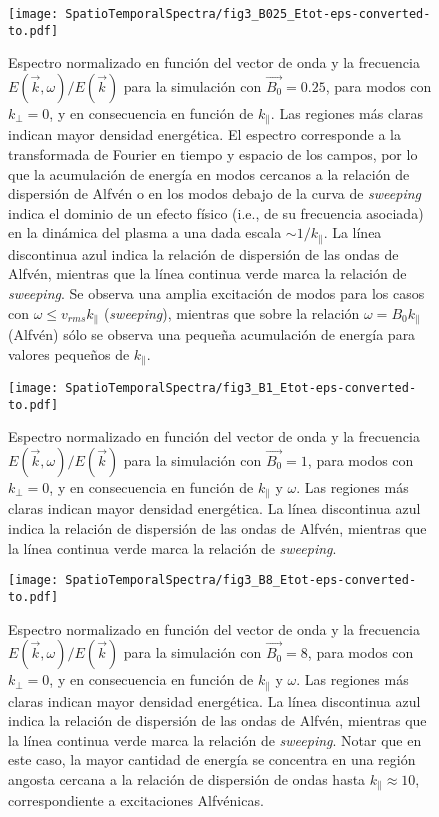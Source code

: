 \begin{figure}
  \centering 
  \texttt{[image: SpatioTemporalSpectra/fig3\_B025\_Etot-eps-converted-to.pdf]}
  \caption{Espectro normalizado en función del vector de onda y la frecuencia
    $E(\vec{k}, \omega)/E(\vec{k})$ para la simulación con
    $\vec{B_0}=0.25$, para modos con $k_\perp=0$, y en consecuencia en
    función de $k_\parallel$. Las regiones más claras indican mayor
    densidad energética. El espectro corresponde a la transformada de
    Fourier en tiempo y espacio de los campos, por lo que la
    acumulación de energía en modos cercanos a la relación de
    dispersión de Alfv\'en o en los modos debajo de la curva
    de \textit{sweeping} indica el dominio de un efecto físico (i.e.,
    de su frecuencia asociada) en la dinámica del plasma a una dada
    escala $\sim 1/k_\parallel$. La línea discontinua azul indica la
    relación de dispersión de las ondas de Alfv\'en, mientras que la
    línea continua verde marca la relación de \textit{sweeping}. Se
    observa una amplia excitación de modos para los casos con
    $\omega \leq v_{rms} k_\parallel$ (\textit{sweeping}), mientras
    que sobre la relación $\omega=B_0 k_\parallel$ (Alfv\'en) sólo se
    observa una pequeña acumulación de energía para valores pequeños
    de $k_\parallel$.}
  \label{fig3-3:B025_bvf_Etot_kperp0}
\end{figure}

\begin{figure}
  \centering
  \texttt{[image: SpatioTemporalSpectra/fig3\_B1\_Etot-eps-converted-to.pdf]}
  \caption{Espectro normalizado en función del vector de onda y la frecuencia
    $E(\vec{k}, \omega)/E(\vec{k})$ para la simulación con
    $\vec{B_0}=1$, para modos con $k_\perp=0$, y en consecuencia en
    función de $k_\parallel$ y $\omega$. Las regiones más claras indican mayor
    densidad energética. La línea discontinua azul indica la
    relación de dispersión de las ondas de Alfv\'en, mientras que la
    línea continua verde marca la relación de \textit{sweeping}.}
  \label{fig3-3:B1_bvf_Etot_kperp0}
\end{figure}

\begin{figure}
  \centering
  \texttt{[image: SpatioTemporalSpectra/fig3\_B8\_Etot-eps-converted-to.pdf]}
  \caption{Espectro normalizado en función del vector de onda y la frecuencia
    $E(\vec{k}, \omega)/E(\vec{k})$ para la simulación con
    $\vec{B_0}=8$, para modos con $k_\perp=0$, y en consecuencia en
    función de $k_\parallel$ y $\omega$. Las regiones más claras indican mayor
    densidad energética. La línea discontinua azul indica la
    relación de dispersión de las ondas de Alfv\'en, mientras que la
    línea continua verde marca la relación de \textit{sweeping}.
    Notar que en este caso, la mayor cantidad de energía se concentra
    en una región angosta cercana a la relación de dispersión de ondas
    hasta $k_\parallel \approx 10$, correspondiente a excitaciones
    Alfv\'enicas.}
  \label{fig3-3:B8_bvf_Etot_kperp0}
\end{figure}


